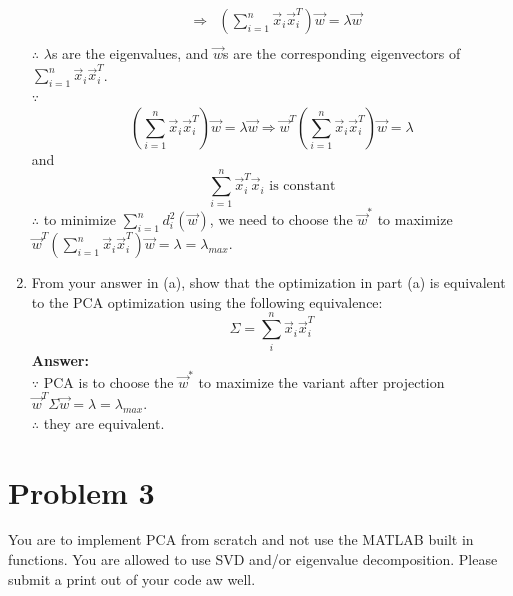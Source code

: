 \documentclass[letterpaper,10pt]{article}
\begin{document}
\begin{enumerate}
\begin{equation}
\begin{array}{rcl}
 & \Rightarrow & \left(\sum_{i=1}^{n}{\vec{x}_i\vec{x}_i^T}\right)\vec{w}=\lambda\vec{w} \\
\end{array}
\end{equation}
$\therefore$ $\lambda$s are the eigenvalues, and $\vec{w}$s are the corresponding eigenvectors of $\sum_{i=1}^{n}{\vec{x}_i\vec{x}_i^T}$.\\
$\because$
$$\left(\sum_{i=1}^{n}{\vec{x}_i\vec{x}_i^T}\right)\vec{w}=\lambda\vec{w}\Rightarrow\vec{w}^T\left(\sum_{i=1}^{n}{\vec{x}_i\vec{x}_i^T}\right)\vec{w}=\lambda$$
and
$$\sum_{i=1}^{n}{\vec{x}_i^T\vec{x}_i}\text{ is constant}$$
$\therefore$ to minimize $\sum_{i=1}^{n}{d_i^2(\vec{w})}$, we need to choose the $\vec{w}^*$ to maximize $\vec{w}^T\left(\sum_{i=1}^{n}{\vec{x}_i\vec{x}_i^T}\right)\vec{w}=\lambda=\lambda_{max}$.

\item From your answer in (a), show that the optimization in part (a) is equivalent to the PCA optimization using the following equivalence:
$$\Sigma = \sum_{i}^{n}{\vec{x}_i\vec{x}_i^T}$$
\textbf{Answer:}\\
$\because$ PCA is to choose the $\vec{w}^*$ to maximize the variant after projection $\vec{w}^T\Sigma\vec{w}=\lambda=\lambda_{max}$.\\
$\therefore$ they are equivalent.
\end{enumerate}



\section*{Problem 3}

You are to implement PCA from scratch and not use the MATLAB built in
functions. You are allowed to use SVD and/or eigenvalue decomposition. Please
submit a print out of your code aw well.
\end{document}

